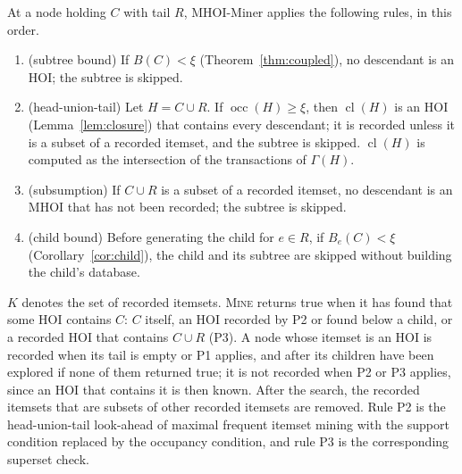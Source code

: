\documentclass[pdflatex,sn-mathphys,Numbered]{sn-jnl}
\theoremstyle{thmstyleone}
\theoremstyle{thmstyletwo}
\theoremstyle{thmstylethree}
\newcommand{\occ}{\operatorname{occ}}
\newcommand{\cl}{\operatorname{cl}}
\newcommand{\Algo}{MHOI-Miner}
\begin{document}
At a node holding $C$ with tail $R$, \Algo{} applies the following rules, in this order.
\begin{enumerate}
\item[\textbf{P1}] (subtree bound) If $B(C) < \xi$ (Theorem~\ref{thm:coupled}), no descendant is an HOI; the subtree is skipped.
\item[\textbf{P2}] (head-union-tail) Let $H = C \cup R$. If $\occ(H) \ge \xi$, then $\cl(H)$ is an HOI (Lemma~\ref{lem:closure}) that contains every descendant; it is recorded unless it is a subset of a recorded itemset, and the subtree is skipped. $\cl(H)$ is computed as the intersection of the transactions of $\Gamma(H)$.
\item[\textbf{P3}] (subsumption) If $C \cup R$ is a subset of a recorded itemset, no descendant is an MHOI that has not been recorded; the subtree is skipped.
\item[\textbf{P4}] (child bound) Before generating the child for $e \in R$, if $B_e(C) < \xi$ (Corollary~\ref{cor:child}), the child and its subtree are skipped without building the child's database.
\end{enumerate}
$K$ denotes the set of recorded itemsets. \textsc{Mine} returns true when it has found that some HOI contains $C$: $C$ itself, an HOI recorded by P2 or found below a child, or a recorded HOI that contains $C \cup R$ (P3). A node whose itemset is an HOI is recorded when its tail is empty or P1 applies, and after its children have been explored if none of them returned true; it is not recorded when P2 or P3 applies, since an HOI that contains it is then known. After the search, the recorded itemsets that are subsets of other recorded itemsets are removed. Rule P2 is the head-union-tail look-ahead of maximal frequent itemset mining \cite{bayardo1998maxminer,burdick2005mafia} with the support condition replaced by the occupancy condition, and rule P3 is the corresponding superset check.
\end{document}

